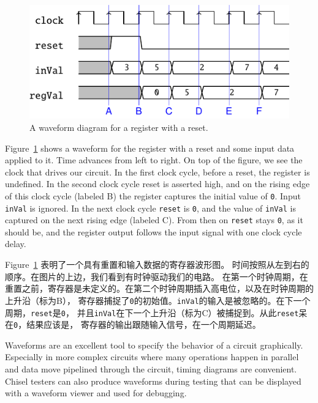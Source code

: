 \documentclass[%
    10pt,
    headinclude, footexclude,
    openright, %
    notitlepage,
    cleardoubleempty,
    headsepline,
    pointlessnumbers,
    bibtotoc, idxtotoc,
    ]{scrbook}
\newcommand{\code}[1]{{\small{\texttt{#1}}}}
\newcommand{\todo}[1]{{\emph{TODO: #1}}}
\renewcommand{\todo}[1]{}
\begin{document}
\todo{from Luca: Do readers know about timing diagrams?}

\begin{figure}
  \centering
  \includegraphics[scale=1]{figures/reg_wave}
  \caption{A waveform diagram for a register with a reset.}
  \label{fig:register-wave}
\end{figure}

Figure~\ref{fig:register-wave} shows a waveform for the register with a reset
and some input data applied to it.
Time advances from left to right. On top of the figure, we see the clock that drives our circuit.
In the first clock cycle, before a reset, the register is undefined. In the second clock cycle reset
is asserted high, and on the rising edge of this clock cycle (labeled B) the register
captures the initial value of \code{0}. Input \code{inVal} is ignored. In the next clock cycle
\code{reset} is \code{0}, and the value of \code{inVal} is captured on the next rising
edge (labeled C). From then on \code{reset} stays \code{0}, as it should be, and the
register output follows the input signal with one clock cycle delay.

Figure~\ref{fig:register-wave} 表明了一个具有重置和输入数据的寄存器波形图。
时间按照从左到右的顺序。在图片的上边，我们看到有时钟驱动我们的电路。
在第一个时钟周期，在重置之前，寄存器是未定义的。在第二个时钟周期插入高电位，以及在时钟周期的上升沿（标为B），
寄存器捕捉了\code{0}的初始值。\code{inVal}的输入是被忽略的。在下一个周期，\code{reset}是\code{0}，
并且\code{inVal}在下一个上升沿（标为C）被捕捉到。从此\code{reset}呆在\code{0}，结果应该是，
寄存器的输出跟随输入信号，在一个周期延迟。

Waveforms are an excellent tool to specify the behavior of a circuit graphically.
Especially in more complex circuits where many operations happen in parallel
and data move pipelined through the circuit, timing diagrams are convenient.
Chisel testers can also produce waveforms during testing that can be displayed
with a waveform viewer and used for debugging.
\end{document}
